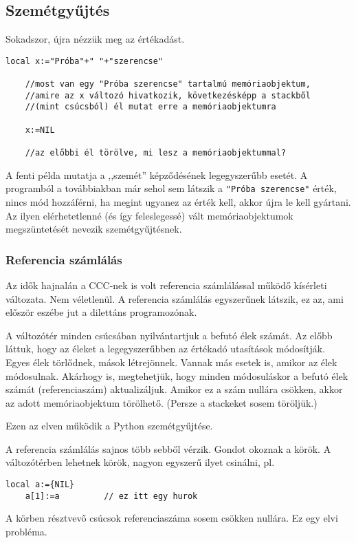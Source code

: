 \subsection{Szemétgyűjtés}

Sokadszor, újra nézzük meg az értékadást.
\begin{verbatim}
local x:="Próba"+" "+"szerencse"

    //most van egy "Próba szerencse" tartalmú memóriaobjektum,
    //amire az x változó hivatkozik, következésképp a stackből 
    //(mint csúcsból) él mutat erre a memóriaobjektumra

    x:=NIL

    //az előbbi él törölve, mi lesz a memóriaobjektummal?
\end{verbatim}

A fenti példa mutatja a ,,szemét'' képződésének legegyszerűbb esetét.
A programból a továbbiakban már sehol sem látszik a \verb!"Próba szerencse"! érték,
nincs mód hozzáférni, ha megint ugyanez az érték kell, akkor újra le kell gyártani.
Az ilyen elérhetetlenné (és így feleslegessé) vált memóriaobjektumok megszüntetését
nevezik szemétgyűjtésnek.


\subsubsection{Referencia számlálás}

Az idők hajnalán a CCC-nek is volt referencia számlálással működő kísérleti változata.
Nem véletlenül. A referencia számlálás egyszerűnek látszik, ez az, ami először eszébe 
jut a dilettáns programozónak.

A változótér  minden csúcsában
nyilvántartjuk a befutó élek számát. Az előbb láttuk, hogy az éleket
a legegyszerűbben az értékadó utasítások módosítják. Egyes élek törlődnek,
mások létrejönnek. Vannak más esetek is, amikor az élek módosulnak. Akárhogy is,
megtehetjük, hogy minden módosuláskor a befutó
élek számát (referenciaszám) aktualizáljuk. Amikor ez a szám nullára csökken, 
akkor az adott memóriaobjektum törölhető. (Persze a stackeket sosem töröljük.)

Ezen az elven működik a Python szemétgyűjtése.

A referencia számlálás sajnos több sebből vérzik. 
Gondot okoznak a körök. 
A változótérben lehetnek körök, nagyon egyszerű ilyet csinálni, pl.
\begin{verbatim}
local a:={NIL}
    a[1]:=a         // ez itt egy hurok
\end{verbatim}
A körben résztvevő csúcsok referenciaszáma sosem csökken nullára. 
Ez egy elvi probléma.

